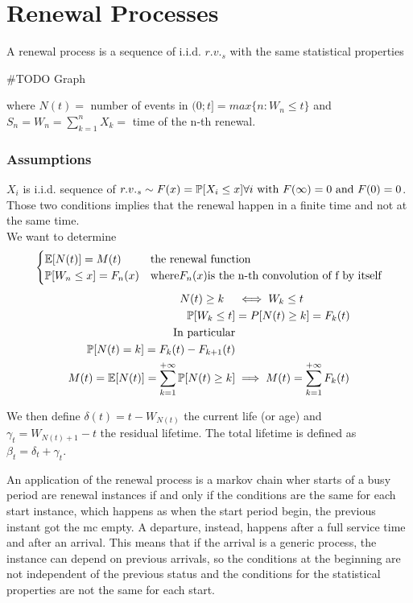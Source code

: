 \chapter{Renewal Processes}
A renewal process is a sequence of i.i.d. $r.v._s$ with the same statistical properties

\#TODO Graph

where $N(t) = $ number of events in $(0;t] = max\{n : W_n \le t \}$ and $ S_n = W_n = \sum\limits_{k=1}^n X_k =$ time of the n-th renewal.

\subsection{Assumptions}
$X_i$ is i.i.d. sequence of $r.v._s \sim F(x) = \mathbb{P}[X_i \le x] \forall i \text{ with } F(\infty)=0
\text{ and } F(0)=0$. Those two conditions implies that the renewal happen in a finite time and not at the same time.
\\ We want to determine
$$\begin{cases}
  \mathbb{E}[N(t)]=M(t) & \text{the renewal function} \\
  \mathbb{P}[W_n \le x] = F_n(x) & \text{where} F_n(x) \text{is the n-th convolution of f by itself}
\end{cases}$$
\begin{equation}\begin{split} \noindent
  N(t)\ge k \quad &\iff W_k \le t\\
  \prob[W_k \le t] &= P[N(t) \ge k] = F_k(t) \\
  \text{In particular} \\
  \prob[N(t)=k] = F_k(t)-F_{k+1}(t)& \\
  M(t) = \exp[N(t)]=\sum\limits_{k=1}^{+\infty}\prob[N(t)\ge k] &\implies M(t)=\sum\limits_{k=1}^{+\infty}F_k(t)
\end{split}\end{equation}

We then define $\delta(t) = t - W_{N(t)}$ the current life (or age) and $\gamma_t = W_{N(t)+1}-t$ the residual lifetime.
The total lifetime is defined as $\beta_t = \delta_t + \gamma_t$.

An application of the renewal process is a markov chain wher starts of a busy period are renewal instances if and only if
the conditions are the same for each start instance, which happens as when the start period begin, the previous instant got the mc empty.
A departure, instead, happens after a full service time and after an arrival. This means that if the arrival is a generic process, the instance
can depend on previous arrivals, so the conditions at the beginning are not independent of the previous status and the conditions
for the statistical properties are not the same for each start.

